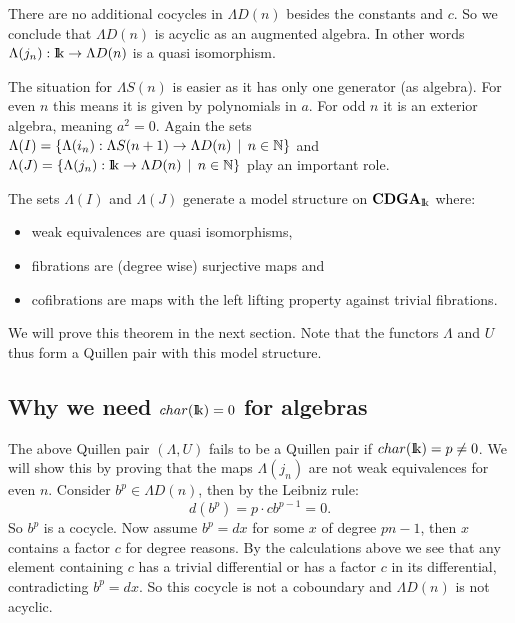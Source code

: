 There are no additional cocycles in $\Lambda D(n)$ besides the constants and $c$. So we conclude that $\Lambda D(n)$ is acyclic as an augmented algebra. In other words $\Lambda(j_n): \mathrm{I\!k} \to \Lambda D(n)$ is a quasi isomorphism.

The situation for $\Lambda S(n)$ is easier as it has only one generator (as algebra). For even $n$ this means it is given by polynomials in $a$. For odd $n$ it is an exterior algebra, meaning $a^2 = 0$. Again the sets $\Lambda(I) = \{ \Lambda(i_n) : \Lambda S(n+1) \to \Lambda D(n) \,\mid\, n \in \mathbb{N}\}$ and $\Lambda(J) = \{ \Lambda(j_n) : \mathrm{I\!k} \to \Lambda D(n) \,\mid\, n \in \mathbb{N}\}$ play an important role.

\begin{theorem}
	The sets $\Lambda(I)$ and $\Lambda(J)$ generate a model structure on $\mathbf{CDGA}_{\mathrm{I\!k}}$ where:
	\begin{itemize}
		\item weak equivalences are quasi isomorphisms,
		\item fibrations are (degree wise) surjective maps and
		\item cofibrations are maps with the left lifting property against trivial fibrations.
	\end{itemize}
\end{theorem}

We will prove this theorem in the next section. Note that the functors $\Lambda$ and $U$ thus form a Quillen pair with this model structure.

\subsection{Why we need $char({\mathrm{I\!k}}) = 0$ for algebras}
The above Quillen pair $(\Lambda, U)$ fails to be a Quillen pair if $char({\mathrm{I\!k}}) = p \neq 0$. We will show this by proving that the maps $\Lambda(j_n)$ are not weak equivalences for even $n$. Consider $b^p \in \Lambda D(n)$, then by the Leibniz rule:
$$ d(b^p) = p \cdot c b^{p-1} = 0. $$
So $b^p$ is a cocycle. Now assume $b^p = d x$ for some $x$ of degree $p n - 1$, then $x$ contains a factor $c$ for degree reasons. By the calculations above we see that any element containing $c$ has a trivial differential or has a factor $c$ in its differential, contradicting $b^p =  d x$. So this cocycle is not a coboundary and $\Lambda D(n)$ is not acyclic.
